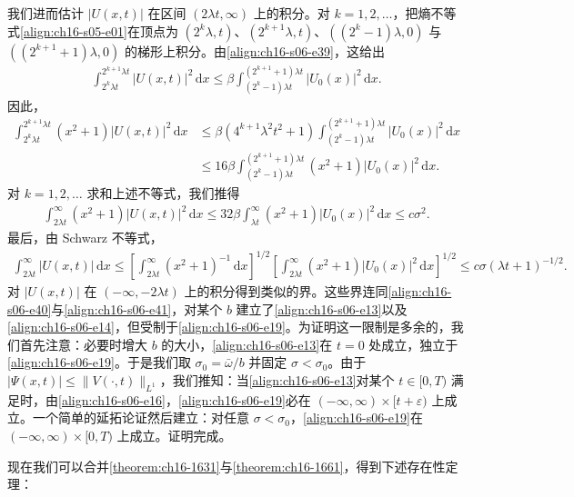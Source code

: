 \documentclass[../../main.tex]{subfiles}
\begin{document}
我们进而估计 $|U(x,t)|$ 在区间 $(2\lambda t,\infty)$ 上的积分。对 $k=1,2,\ldots$，把熵不等式\eqref{align:ch16-s05-e01}在顶点为 $(2^k\lambda,t)$、$(2^{k+1}\lambda,t)$、$((2^k-1)\lambda,0)$ 与 $((2^{k+1}+1)\lambda,0)$ 的梯形上积分。由\eqref{align:ch16-s06-e39}，这给出
\begin{align}
\int_{2^k\lambda t}^{2^{k+1}\lambda t}|U(x,t)|^2\,\mathrm{d}x\leqslant\beta\int_{(2^k-1)\lambda t}^{(2^{k+1}+1)\lambda t}|U_0(x)|^2\,\mathrm{d}x.
\label{align:ch16-s06-e42}
\end{align}
因此，
\begin{align}
\int_{2^k\lambda t}^{2^{k+1}\lambda t}(x^2+1)|U(x,t)|^2\,\mathrm{d}x&\leqslant\beta(4^{k+1}\lambda^2t^2+1)\int_{(2^k-1)\lambda t}^{(2^{k+1}+1)\lambda t}|U_0(x)|^2\,\mathrm{d}x\nonumber\\
&\leqslant16\beta\int_{(2^k-1)\lambda t}^{(2^{k+1}+1)\lambda t}(x^2+1)|U_0(x)|^2\,\mathrm{d}x.
\label{align:ch16-s06-e43}
\end{align}
对 $k=1,2,\ldots$ 求和上述不等式，我们推得
\begin{align}
\int_{2\lambda t}^{\infty}(x^2+1)|U(x,t)|^2\,\mathrm{d}x\leqslant32\beta\int_{\lambda t}^{\infty}(x^2+1)|U_0(x)|^2\,\mathrm{d}x\leqslant c\sigma^2.
\label{align:ch16-s06-e44}
\end{align}
最后，由 Schwarz 不等式，
\begin{align}
\int_{2\lambda t}^{\infty}|U(x,t)|\,\mathrm{d}x\leqslant\left[\int_{2\lambda t}^{\infty}(x^2+1)^{-1}\,\mathrm{d}x\right]^{1/2}\left[\int_{2\lambda t}^{\infty}(x^2+1)|U_0(x)|^2\,\mathrm{d}x\right]^{1/2}\leqslant c\sigma(\lambda t+1)^{-1/2}.
\label{align:ch16-s06-e45}
\end{align}
对 $|U(x,t)|$ 在 $(-\infty,-2\lambda t)$ 上的积分得到类似的界。这些界连同\eqref{align:ch16-s06-e40}与\eqref{align:ch16-s06-e41}，对某个 $b$ 建立了\eqref{align:ch16-s06-e13}以及\eqref{align:ch16-s06-e14}，但受制于\eqref{align:ch16-s06-e19}。为证明这一限制是多余的，我们首先注意：必要时增大 $b$ 的大小，\eqref{align:ch16-s06-e13}在 $t=0$ 处成立，独立于\eqref{align:ch16-s06-e19}。于是我们取 $\sigma_0=\bar\omega/b$ 并固定 $\sigma<\sigma_0$。由于 $|\Psi(x,t)|\leqslant\|V(\cdot,t)\|_{L^1}$，我们推知：当\eqref{align:ch16-s06-e13}对某个 $t\in[0,T)$ 满足时，由\eqref{align:ch16-s06-e16}，\eqref{align:ch16-s06-e19}必在 $(-\infty,\infty)\times[t+\varepsilon)$ 上成立。一个简单的延拓论证然后建立：对任意 $\sigma<\sigma_0$，\eqref{align:ch16-s06-e19}在 $(-\infty,\infty)\times[0,T)$ 上成立。证明完成。

现在我们可以合并\cref{theorem:ch16-1631}与\cref{theorem:ch16-1661}，得到下述存在性定理：
\end{document}
